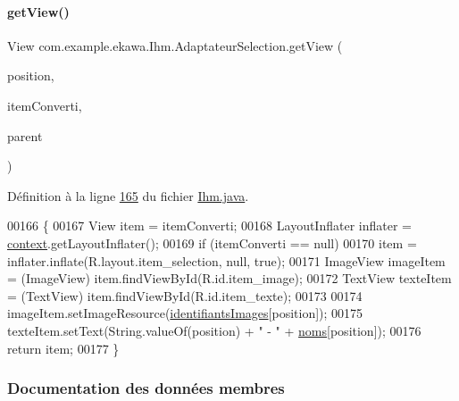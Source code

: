 \paragraph{\texorpdfstring{get\+View()}{getView()}}
{\footnotesize\ttfamily View com.\+example.\+ekawa.\+Ihm.\+Adaptateur\+Selection.\+get\+View (\begin{DoxyParamCaption}\item[{int}]{position,  }\item[{View}]{item\+Converti,  }\item[{View\+Group}]{parent }\end{DoxyParamCaption})}



Définition à la ligne \hyperlink{_ihm_8java_source_l00165}{165} du fichier \hyperlink{_ihm_8java_source}{Ihm.\+java}.


\begin{DoxyCode}
00166         \{
00167             View item = itemConverti;
00168             LayoutInflater inflater = \hyperlink{classcom_1_1example_1_1ekawa_1_1_ihm_1_1_adaptateur_selection_a9605d2f9384114fcb57da610a7071676}{context}.getLayoutInflater();
00169             \textcolor{keywordflow}{if} (itemConverti == null)
00170                 item = inflater.inflate(R.layout.item\_selection, null, \textcolor{keyword}{true});
00171             ImageView imageItem = (ImageView) item.findViewById(R.id.item\_image);
00172             TextView texteItem = (TextView) item.findViewById(R.id.item\_texte);
00173 
00174             imageItem.setImageResource(\hyperlink{classcom_1_1example_1_1ekawa_1_1_ihm_1_1_adaptateur_selection_ac242f0e242c82c556fb9bba16a5207d1}{identifiantsImages}[position]);
00175             texteItem.setText(String.valueOf(position) + \textcolor{stringliteral}{" - "} + \hyperlink{classcom_1_1example_1_1ekawa_1_1_ihm_1_1_adaptateur_selection_a5d71a6dd60ad53aa95ae59bb094b4002}{noms}[position]);
00176             \textcolor{keywordflow}{return} item;
00177         \}
\end{DoxyCode}


\subsubsection{Documentation des données membres}
\mbox{\label{classcom_1_1example_1_1ekawa_1_1_ihm_1_1_adaptateur_selection_a9605d2f9384114fcb57da610a7071676}} 
